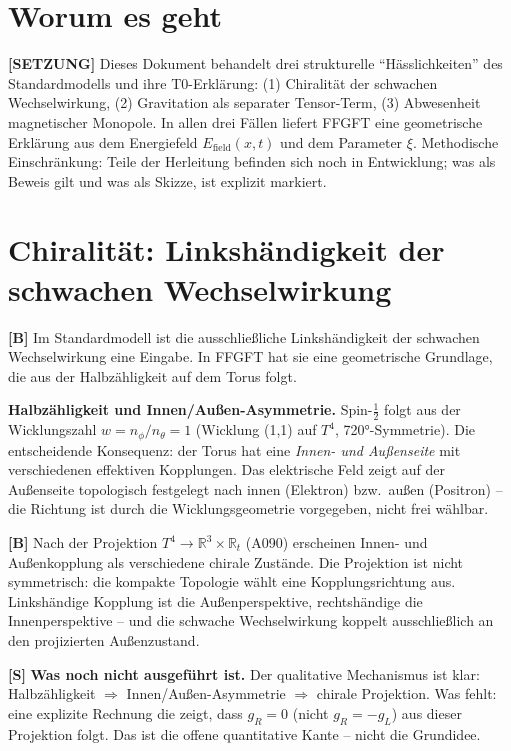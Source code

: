 \section{Worum es geht}

\textbf{[SETZUNG]} Dieses Dokument behandelt drei strukturelle ``Hässlichkeiten'' des
Standardmodells und ihre T0-Erklärung: (1) Chiralität der schwachen Wechselwirkung,
(2) Gravitation als separater Tensor-Term, (3) Abwesenheit magnetischer Monopole.
In allen drei Fällen liefert FFGFT eine geometrische Erklärung aus dem Energiefeld
$E_\text{field}(x,t)$ und dem Parameter $\xi$. Methodische Einschränkung: Teile
der Herleitung befinden sich noch in Entwicklung; was als Beweis gilt und was als
Skizze, ist explizit markiert.

\section{Chiralität: Linkshändigkeit der schwachen Wechselwirkung}

\textbf{[B]} Im Standardmodell ist die ausschließliche Linkshändigkeit der schwachen
Wechselwirkung eine Eingabe. In FFGFT hat sie eine geometrische Grundlage, die aus
der Halbzähligkeit auf dem Torus folgt.

\textbf{Halbzähligkeit und Innen/Außen-Asymmetrie.} Spin-$\tfrac12$ folgt aus der
Wicklungszahl $w=n_\phi/n_\theta=1$ (Wicklung (1,1) auf $T^4$, 720°-Symmetrie).
Die entscheidende Konsequenz: der Torus hat eine \emph{Innen- und Außenseite} mit
verschiedenen effektiven Kopplungen. Das elektrische Feld zeigt auf der Außenseite
topologisch festgelegt nach innen (Elektron) bzw.\ außen (Positron) -- die Richtung
ist durch die Wicklungsgeometrie vorgegeben, nicht frei wählbar.

\textbf{[B]} Nach der Projektion $T^4\to\mathbb{R}^3\times\mathbb{R}_t$ (A090)
erscheinen Innen- und Außenkopplung als verschiedene chirale Zustände. Die
Projektion ist nicht symmetrisch: die kompakte Topologie wählt eine Kopplungsrichtung
aus. Linkshändige Kopplung ist die Außenperspektive, rechtshändige die
Innenperspektive -- und die schwache Wechselwirkung koppelt ausschließlich an den
projizierten Außenzustand.

\textbf{[S]} \textbf{Was noch nicht ausgeführt ist.} Der qualitative Mechanismus
ist klar: Halbzähligkeit $\Rightarrow$ Innen/Außen-Asymmetrie $\Rightarrow$ chirale
Projektion. Was fehlt: eine explizite Rechnung die zeigt, dass $g_R=0$ (nicht
$g_R=-g_L$) aus dieser Projektion folgt. Das ist die offene quantitative Kante --
nicht die Grundidee.

